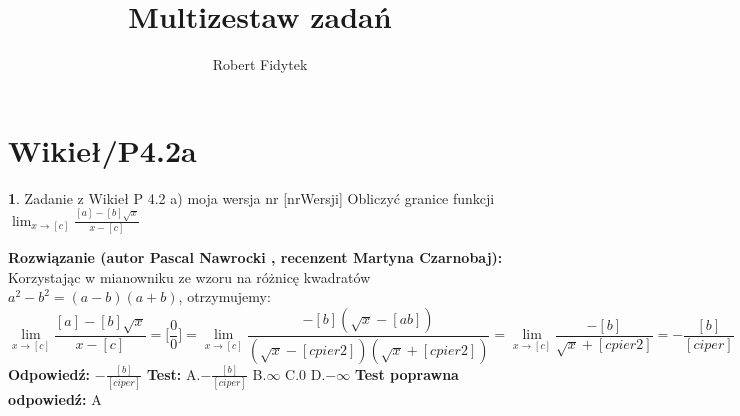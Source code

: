 \documentclass[12pt, a4paper]{article}
\title{Multizestaw zadań}
\author{Robert Fidytek}
\date{}
\theoremstyle{definition} %
\newtheorem{zad}{}
\newcommand{\kategoria}[1]{\section{#1}} %
\newcommand{\zadStart}[1]{\begin{zad}#1\newline} %
\newcommand{\zadStop}{\end{zad}}   %
\newcommand{\rozwStart}[2]{\noindent \textbf{Rozwiązanie (autor #1 , recenzent #2): }\newline} %
\newcommand{\rozwStop}{\newline}                                            %
\newcommand{\odpStart}{\noindent \textbf{Odpowiedź:}\newline}    %
\newcommand{\odpStop}{\newline}                                             %
\newcommand{\testStart}{\noindent \textbf{Test:}\newline} %
\newcommand{\testStop}{\newline} %
\newcommand{\kluczStart}{\noindent \textbf{Test poprawna odpowiedź:}\newline} %
\newcommand{\kluczStop}{\newline} %
\begin{document}
\maketitle


\kategoria{Wikieł/P4.2a}
\zadStart{Zadanie z Wikieł P 4.2 a) moja wersja nr [nrWersji]}
Obliczyć granice funkcji $\displaystyle{\lim_{x \to [c]}} \frac{[a]-[b]\sqrt{x}}{x-[c]}$
\zadStop
\rozwStart{Pascal Nawrocki}{Martyna Czarnobaj}
Korzystając w mianowniku ze wzoru na różnicę kwadratów $a^2-b^2=(a-b)(a+b)$, otrzymujemy:
$$\displaystyle{\lim_{x \to [c]}} \frac{[a]-[b]\sqrt{x}}{x-[c]}=\big[\frac{0}{0}\big]=\displaystyle{\lim_{x \to [c]}} \frac{-[b](\sqrt{x}-[ab])}{(\sqrt{x}-[cpier2])(\sqrt{x}+[cpier2])}=\displaystyle{\lim_{x \to [c]}} \frac{-[b]}{\sqrt{x}+[cpier2]}=-\frac{[b]}{[ciper]}$$
\rozwStop
\odpStart
$-\frac{[b]}{[ciper]}$
\odpStop
\testStart
A.$-\frac{[b]}{[ciper]}$
B.$\infty$
C.$0$
D.$-\infty$
\testStop
\kluczStart
A
\kluczStop
\end{document}
